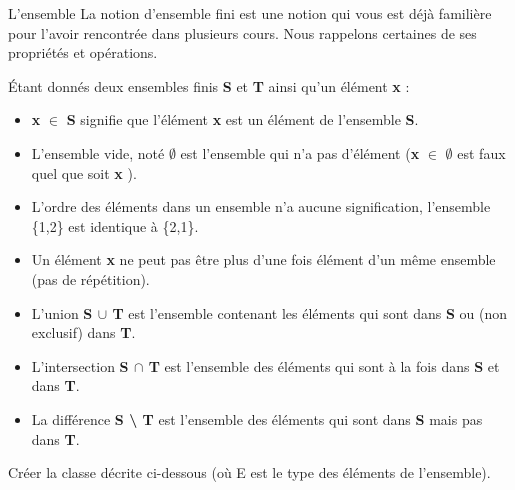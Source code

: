\begin{Exercice}{L'ensemble}
	La notion d’ensemble fini est une notion qui vous est déjà 
	familière pour l’avoir rencontrée dans plusieurs cours. Nous rappelons
	certaines de ses propriétés et opérations. 
			
	Étant donnés deux ensembles
	finis \textbf{S} et \textbf{T} ainsi qu’un élément \textbf{x} :

	\begin{itemize}
	\item 
		\textbf{x} {${\in}$} \textbf{S} signifie que l’élément \textbf{x}
		est un élément de l’ensemble \textbf{S}.
	\item 
		L’ensemble vide, noté \textbf{${\emptyset}$} 
		est l’ensemble qui n’a pas d’élément 
		(\textbf{x} {${\in}$} \textbf{${\emptyset}$} 
		est faux quel que soit \textbf{x} ).
	\item 
		L’ordre des éléments dans un ensemble n’a
		aucune signification, l’ensemble \{1,2\} est
		identique à \{2,1\}.
	\item 
		Un élément \textbf{x} ne peut
		pas être plus d’une fois élément d’un même ensemble 
		(pas de répétition).
	\item 
		L’union \textbf{S ${\cup}$ T} 
		est l’ensemble contenant les éléments qui sont dans 
		\textbf{S} ou (non exclusif) dans \textbf{T}.
	\item 
		L’intersection \textbf{S ${\cap}$ T} 
		est l’ensemble des éléments qui sont à la fois 
		dans \textbf{S} et dans \textbf{T}.
	\item 
		La différence \textbf{S {\textbackslash} T} 
		est l’ensemble des éléments qui sont 
		dans \textbf{S} mais pas dans \textbf{T}.
	\end{itemize}
	
	Créer la classe 
	décrite ci-dessous
	(où E est le type des éléments de l'ensemble).
	

\end{Exercice}
